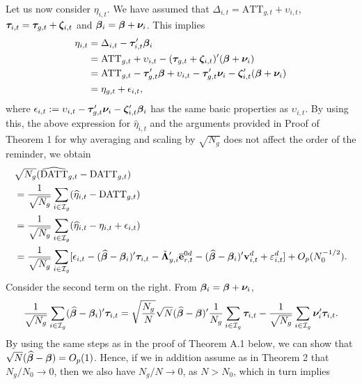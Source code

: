 \documentclass[12pt,fleqn]{article}
\begin{document}
Let us now consider $\eta_{i,t}$. We have assumed that $\Delta_{i,t} = \mathrm{ATT}_{g,t} + \upsilon_{i,t}$, $\boldsymbol{\tau}_{i,t}= \boldsymbol{\tau}_{g,t} + \boldsymbol{\zeta}_{i,t}$ and $\boldsymbol{\beta}_{i} = \boldsymbol{\beta} + \boldsymbol{\nu}_i$. This implies
\begin{align}
\eta_{i,t} & =  \Delta_{i,t} - \boldsymbol{\tau}_{i,t}'\boldsymbol{\beta}_i \notag\\
& = \mathrm{ATT}_{g,t} + \upsilon_{i,t} - (\boldsymbol{\tau}_{g,t} + \boldsymbol{\zeta}_{i,t})'(\boldsymbol{\beta} + \boldsymbol{\nu}_i) \notag\\
& = \mathrm{ATT}_{g,t}  - \boldsymbol{\tau}_{g,t}'\boldsymbol{\beta} + \upsilon_{i,t} - \boldsymbol{\tau}_{g,t}'\boldsymbol{\nu}_i - \boldsymbol{\zeta}_{i,t}'(\boldsymbol{\beta} + \boldsymbol{\nu}_i) \notag\\
& =  \eta_{g,t} + \epsilon_{i,t},
\end{align}
where $\epsilon_{i,t} : = \upsilon_{i,t}- \boldsymbol{\tau}_{g,t}'\boldsymbol{\nu}_i - \boldsymbol{\zeta}_{i,t}'\boldsymbol{\beta}_i$ has the same basic properties as $\upsilon_{i,t}$. By using this, the above expression for $\widehat \eta_{i,t}$ and the arguments provided in Proof of Theorem 1 for why averaging and scaling by $\sqrt{N_g}$ does not affect the order of the reminder, we obtain
\begin{align}
& \sqrt{N_g}(\widehat{\mathrm{DATT}}_{g,t} - \mathrm{DATT}_{g,t})\notag\\
& = \frac{1}{\sqrt{N_g}} \sum_{i\in \mathcal{I}_g} (\widehat \eta_{i,t} - \mathrm{DATT}_{g,t}) \notag\\
& = \frac{1}{\sqrt{N_g}} \sum_{i\in \mathcal{I}_g} (\widehat \eta_{i,t} - \eta_{i,t} + \epsilon_{i,t}) \notag\\
& = \frac{1}{\sqrt{N_g}} \sum_{i\in \mathcal{I}_g} [\epsilon_{i,t} -(\widehat{\boldsymbol{\beta}}-\boldsymbol{\beta}_i)'\boldsymbol{\tau}_{i,t} - \tilde{\boldsymbol{\Lambda}}_{y,i}'\overline{\mathbf{e}}_{r,t}^{0d} - (\widehat{\boldsymbol{\beta}}-\boldsymbol{\beta}_i)'\mathbf{v}_{i,t}^d + \varepsilon_{i,t}^d ] + O_p(N_0^{-1/2}) .
\end{align}
Consider the second term on the right. From $\boldsymbol{\beta}_{i} = \boldsymbol{\beta} + \boldsymbol{\nu}_i$,
\begin{align}
\frac{1}{\sqrt{N_g}} \sum_{i\in \mathcal{I}_g} (\widehat{\boldsymbol{\beta}}-\boldsymbol{\beta}_i)'\boldsymbol{\tau}_{i,t} = \sqrt{\frac{N_g}{N}}\sqrt{N}(\widehat{\boldsymbol{\beta}}-\boldsymbol{\beta})'\frac{1}{N_g} \sum_{i\in \mathcal{I}_g}\boldsymbol{\tau}_{i,t} - \frac{1}{\sqrt{N_g}} \sum_{i\in \mathcal{I}_g} \boldsymbol{\nu}_i'\boldsymbol{\tau}_{i,t}.
\end{align}
By using the same steps as in the proof of Theorem A.1 below, we can show that $\sqrt{N}(\widehat{\boldsymbol{\beta}}-\boldsymbol{\beta}) = O_p(1)$. Hence, if we in addition assume as in Theorem 2 that $N_g/N_0\to 0$, then we also have $N_g/N \to 0$, as $N > N_0$, which in turn implies
\end{document}
